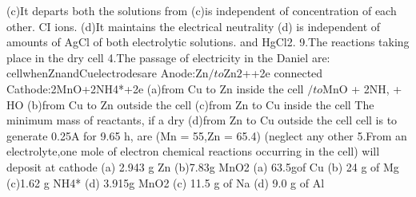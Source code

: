\begin{problembox}
(c)It departs both the solutions from
(c)is independent of concentration of
each other.
CI ions.
(d)It maintains the electrical neutrality
(d) is independent of amounts of AgCl
of both electrolytic solutions.
and HgCl2.
9.The reactions taking place in the dry cell
4.The passage of electricity in the Daniel
are:
cellwhenZnandCuelectrodesare
Anode:Zn$/to$Zn$2$++2e
connected
Cathode:2MnO+2NH4*+2e
(a)from Cu to Zn inside the cell
$/to$MnO + 2NH, + HO
(b)from Cu to Zn outside the cell
(c)from Zn to Cu inside the cell
The minimum mass of reactants, if a dry
(d)from Zn to Cu outside the cell
cell is to generate 0.25A for 9.65 h, are
(Mn = 55,Zn = 65.4) (neglect any other
5.From an electrolyte,one mole of electron
chemical reactions occurring in the cell)
will deposit at cathode
(a) 2.943 g Zn
(b)7.83g MnO2
(a) 63.5gof Cu
(b) 24 g of Mg
(c)1.62 g NH4*
(d) 3.915g MnO2
(c) 11.5 g of Na
(d) 9.0 g of Al
\end{problembox}

